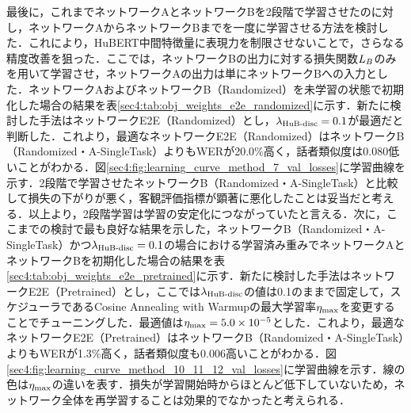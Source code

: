 最後に，これまでネットワークAとネットワークBを2段階で学習させたのに対し，ネットワークAからネットワークBまでを一度に学習させる方法を検討した．これにより，HuBERT中間特徴量に表現力を制限させないことで，さらなる精度改善を狙った．ここでは，ネットワークBの出力に対する損失関数$L_{B}$のみを用いて学習させ，ネットワークAの出力は単にネットワークBへの入力とした．ネットワークAおよびネットワークB（Randomized）を未学習の状態で初期化した場合の結果を表\ref{sec4:tab:obj_weights_e2e_randomized}に示す．新たに検討した手法はネットワークE2E（Randomized）とし，$\lambda_{\text{HuB-disc}} = 0.1$が最適だと判断した．これより，最適なネットワークE2E（Randomized）はネットワークB（Randomized・A-SingleTask）よりもWERが20.0\%高く，話者類似度は0.080低いことがわかる．図\ref{sec4:fig:learning_curve_method_7_val_losses}に学習曲線を示す．2段階で学習させたネットワークB（Randomized・A-SingleTask）と比較して損失の下がりが悪く，客観評価指標が顕著に悪化したことは妥当だと考える．以上より，2段階学習は学習の安定化につながっていたと言える．次に，ここまでの検討で最も良好な結果を示した，ネットワークB（Randomized・A-SingleTask）かつ$\lambda_{\text{HuB-disc}} = 0.1$の場合における学習済み重みでネットワークAとネットワークBを初期化した場合の結果を表\ref{sec4:tab:obj_weights_e2e_pretrained}に示す．新たに検討した手法はネットワークE2E（Pretrained）とし，ここでは$\lambda_{\text{HuB-disc}}$の値は0.1のままで固定して，スケジューラであるCosine Annealing with Warmupの最大学習率$\eta_{\text{max}}$を変更することでチューニングした．最適値は$\eta_{\text{max}} = 5.0 \times 10^{-5}$とした．これより，最適なネットワークE2E（Pretrained）はネットワークB（Randomized・A-SingleTask）よりもWERが1.3\%高く，話者類似度も0.006高いことがわかる．図\ref{sec4:fig:learning_curve_method_10_11_12_val_losses}に学習曲線を示す．線の色は$\eta_{\text{max}}$の違いを表す．損失が学習開始時からほとんど低下していないため，ネットワーク全体を再学習することは効果的でなかったと考えられる．

